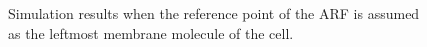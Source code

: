 \documentclass[a4paper,12pt, oneside]{book}
\begin{document}
\begin{figure}[tbp]
 \caption{Simulation results when the reference point of the ARF is assumed as the leftmost membrane molecule of the cell.}
 \label{fig:res2}
\end{figure}

\end{document}
